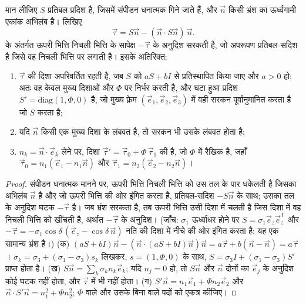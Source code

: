 \begin{theorem}[तल पर सरकन-दिशा]\label{thm:b3:structural-analysis:wallace-bott}
मान लीजिए $S$ प्रतिबल प्रदिश है, जिसमें संपीडन धनात्मक गिने जाते हैं, और $\vec n$
किसी भ्रंश का ऊर्ध्वगामी एकांक अभिलंब है। लिखिए
\[
  \vec\tau = S\vec n - (\vec n\cdot S\vec n)\,\vec n .
\]
 के अंतर्गत ऊपरी भित्ति निचली भित्ति के सापेक्ष
$-\vec\tau$ के अनुदिश सरकती है, जो अपरूपण प्रतिबल-सदिश है जिसे वह निचली भित्ति पर लगाती है।
इसके अतिरिक्त:
\begin{enumerate}[label=(\alph*)]
  \item $\vec\tau$ की दिशा अपरिवर्तित रहती है, जब $S$ को $aS +
        bI$ से प्रतिस्थापित किया जाए और $a > 0$ हो; अतः वह केवल मुख्य दिशाओं और
        $\Phi$ पर निर्भर करती है, और घटा हुआ प्रदिश $S' =
        \mathrm{diag}(1, \Phi, 0)$ है, जो मुख्य फ़्रेम $(\vec e_1, \vec
        e_2, \vec e_3)$ में वही सरकन पूर्वानुमानित करता है जो $S$ करता है;
  \item यदि $\vec n$ किसी एक मुख्य दिशा के लंबवत है, तो सरकन भी
        उसके लंबवत होता है;
  \item $n_k = \vec n\cdot\vec e_k$ लेने पर, दिशा $\vec\tau'
        = \vec\tau_0 + \Phi\,\vec\tau_1$ की है, जो $\Phi$ में रैखिक है, जहाँ $\vec\tau_0
        = n_1(\vec e_1 - n_1\vec n)$ और $\vec\tau_1 = n_2(\vec e_2 - n_2\vec
        n)$।
\end{enumerate}
\end{theorem}

\begin{proof}
संपीडन धनात्मक मानने पर, ऊपरी भित्ति निचली भित्ति को उस तल के पार धकेलती है
जिसका अभिलंब $\vec n$ है और जो ऊपरी भित्ति की ओर इंगित करता है, प्रतिबल-सदिश
$-S\vec n$ के साथ; उसका तल के अनुदिश घटक $-\vec\tau$ है।
जब भ्रंश सरकता है, तब ऊपरी भित्ति उसी दिशा में चलती है जिस दिशा में वह
निचली भित्ति को खींचती है, अर्थात $-\vec\tau$ के अनुदिश। (जाँच: $\sigma_1$ ऊर्ध्वाधर होने पर $S = \sigma_1\vec e_z\vec
e_z^{\mathsf T}$ और $-\vec\tau = -\sigma_1\cos\delta\,(\vec e_z -
\cos\delta\,\vec n)$ नति की दिशा में नीचे की ओर इंगित करता है: यह एक सामान्य भ्रंश है।)
(क) $(aS + bI)\vec n - (\vec n\cdot(aS + bI)\vec n)\vec n = a\vec\tau + b(\vec
n - \vec n) = a\vec\tau$। $\sigma_k = \sigma_3 + (\sigma_1 -
\sigma_3)s_k$ लिखकर, $s = (1, \Phi, 0)$ के साथ, $S = \sigma_3 I + (\sigma_1 -
\sigma_3)S'$ प्राप्त होता है।
(ख) $S\vec n = \sum_k\sigma_kn_k\vec e_k$; यदि $n_j = 0$ हो, तो $S\vec n$ और $\vec n$ दोनों का
$\vec e_j$ के अनुदिश कोई घटक नहीं होता, और $\vec\tau$ में भी नहीं होता।
(ग) $S'\vec n = n_1\vec e_1 + \Phi n_2\vec e_2$ और $\vec n\cdot S'\vec n =
n_1^2 + \Phi n_2^2$; $\Phi$ वाले और उसके बिना वाले पदों को एकत्र कीजिए।
\end{proof}

